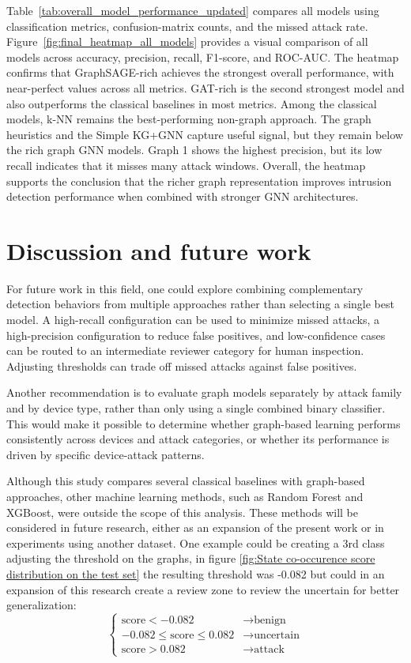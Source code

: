 \documentclass[final,5p,times,twocolumn]{elsarticle}
\begin{document}
Table~\ref{tab:overall_model_performance_updated} compares all models using classification metrics, confusion-matrix counts, and the missed attack rate. Figure~\ref{fig:final_heatmap_all_models} provides a visual comparison of all models across accuracy, precision, recall, F1-score, and ROC-AUC. The heatmap confirms that GraphSAGE-rich achieves the strongest overall performance, with near-perfect values across all metrics. GAT-rich is the second strongest model and also outperforms the classical baselines in most metrics. Among the classical models, k-NN remains the best-performing non-graph approach. The graph heuristics and the Simple KG+GNN capture useful signal, but they remain below the rich graph GNN models. Graph 1 shows the highest precision, but its low recall indicates that it misses many attack windows. Overall, the heatmap supports the conclusion that the richer graph representation improves intrusion detection performance when combined with stronger GNN architectures. 

\clearpage
\twocolumn

\section{Discussion and future work}
\label{Discussion}
For future work in this field, one could explore combining complementary detection behaviors from multiple approaches rather than selecting a single best model. A high-recall configuration can be used to minimize missed attacks, a high-precision configuration to reduce false positives, and low-confidence cases can be routed to an intermediate reviewer category for human inspection. Adjusting thresholds can trade off missed attacks against false positives.

Another recommendation is to evaluate graph models separately by attack family and by device type, rather than only using a single combined binary classifier. This would make it possible to determine whether graph-based learning performs consistently across devices and attack categories, or whether its performance is driven by specific device-attack patterns.

Although this study compares several classical baselines with graph-based approaches, other machine learning methods, such as Random Forest and XGBoost, were outside the scope of this analysis. These methods will be considered in future research, either as an expansion of the present work or in experiments using another dataset. One example could be creating a 3rd class adjusting the threshold on the graphs, in figure \ref{fig:State co-occurence score distribution on the test set} the resulting threshold was -0.082 but could in an expansion of this research create a review zone to review the uncertain for better generalization:
\[
\begin{cases}
\text{score} < -0.082 & \rightarrow \text{benign} \\
-0.082 \leq \text{score} \leq 0.082 & \rightarrow \text{uncertain} \\
\text{score} > 0.082 & \rightarrow \text{attack}
\end{cases}
\]
\end{document}
